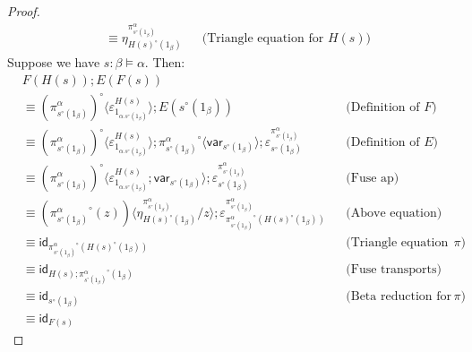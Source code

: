 \documentclass[10pt]{article}
\theoremstyle{definition}
\newcommand\TrCirc[2]{\ensuremath{{#1}^\circ(#2)}}
\newcommand\var[1]{\ensuremath{\mathsf{var}_{#1}}}
\newcommand{\id}{\mathsf{id}}
\newcommand\ap[2]{\ensuremath{#1 \langle #2 \rangle }}
\begin{document}
\begin{proof}
\begin{align*}
&\equiv \eta^{{\pi^\alpha_{\TrCirc{{s}}{1_\beta}}}}_{\TrCirc{{H(s)}}{1_\beta}}
&&\text{(Triangle equation for $H(s)$)}
\end{align*}
Suppose we have $s : \beta \vDash \alpha$. Then:
\begin{align*}
&F(H(s)) ; E(F(s)) \\
&\equiv \ap{({\pi^\alpha_{\TrCirc{{s}}{1_\beta}}})^\circ}{\varepsilon^{{H(s)}}_{1_{\alpha.\TrCirc{{s}}{1_\beta}}}} ; E(\TrCirc{{s}}{1_\beta}) && \text{(Definition of $F$)} \\
&\equiv \ap{({\pi^\alpha_{\TrCirc{{s}}{1_\beta}}})^\circ}{\varepsilon^{{H(s)}}_{1_{\alpha.\TrCirc{{s}}{1_\beta}}}} ; \ap{{\pi^\alpha_{\TrCirc{{s}}{1_\beta}}}^\circ}{\var{\TrCirc{{s}}{1_\beta}}};\varepsilon^{{\pi^\alpha_{\TrCirc{{s}}{1_\beta}}}}_{\TrCirc{{s}}{1_\beta}} && \text{(Definition of $E$)} \\
&\equiv \ap{({\pi^\alpha_{\TrCirc{{s}}{1_\beta}}})^\circ}{\varepsilon^{{H(s)}}_{1_{\alpha.\TrCirc{{s}}{1_\beta}}}; \var{\TrCirc{{s}}{1_\beta}}} ;\varepsilon^{{\pi^\alpha_{\TrCirc{{s}}{1_\beta}}}}_{\TrCirc{{s}}{1_\beta}} && \text{(Fuse ap)} \\
&\equiv \ap{(\TrCirc{{\pi^\alpha_{\TrCirc{{s}}{1_\beta}}}}{z})}{\eta^{{\pi^\alpha_{\TrCirc{{s}}{1_\beta}}}}_{\TrCirc{{H(s)}}{1_\beta}}/z};\varepsilon^{{\pi^\alpha_{\TrCirc{{s}}{1_\beta}}}}_{\TrCirc{{\pi^\alpha_{\TrCirc{{s}}{1_\beta}}}}{\TrCirc{{H(s)}}{1_\beta}}} && \text{(Above equation)} \\
&\equiv \id_{\TrCirc{{\pi^\alpha_{\TrCirc{{s}}{1_\beta}}}}{\TrCirc{{H(s)}}{1_\beta}}} && \text{(Triangle equation for $\pi$)} \\
&\equiv \id_{\TrCirc{{H(s);\pi^\alpha_{\TrCirc{{s}}{1_\beta}}}}{1_\beta}} && \text{(Fuse transports)} \\
&\equiv \id_{\TrCirc{{s}}{1_\beta}} && \text{(Beta reduction for $\pi$)} \\
&\equiv \id_{F(s)}
\end{align*}


\end{proof}
\end{document}
